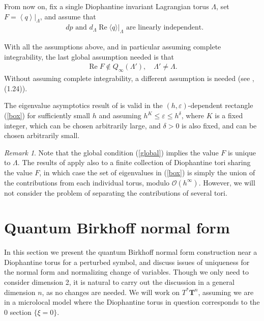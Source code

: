 \documentclass[12pt,lettersize]{article}
\DeclareMathOperator{\Real}{Re}
\renewcommand{\epsilon}{\varepsilon}
\theoremstyle{plain}%
\numberwithin{theorem}{section}
\numberwithin{equation}{section}
\theoremstyle{definition}
\theoremstyle{remark}
\newtheorem{remark}[theorem]{Remark}
\begin{document}
{From now on, fix a single Diophantine invariant Lagrangian torus $\Lambda$, set $F = \left\langle q \right\rangle|_{\Lambda}$, and assume that 
%
\begin{align}\label{nondeg}
\text{ $dp$ and $d_\Lambda\Real\langle q \rangle|_\Lambda$ are linearly independent.}
\end{align}
%


With all the assumptions above, and in particular assuming complete integrability, the last global assumption needed is that
%
\begin{align}\label{global}
\Real F \not\in Q_\infty(\Lambda'), \quad \Lambda' \neq \Lambda. 
\end{align}
%
Without assuming complete integrability, a different assumption is needed (see \cite{HSV}, (1.24)).

The eigenvalue asymptotics result of \cite{HSV} is valid in the $(h,\epsilon)$-dependent rectangle (\ref{box}) for sufficiently small $h$ and assuming $h^K \leq \epsilon \leq h^\delta$, where $K$ is a fixed integer, which can be chosen arbitrarily large, and $\delta > 0$ is also fixed, and can be chosen arbitrarily small. 

\begin{remark}
Note that the global condition (\ref{global}) implies the value $F$ is unique to $\Lambda$. The results of \cite{HSV} apply also to a finite collection of Diophantine tori sharing the value $F$, in which case the set of eigenvalues in (\ref{box}) is simply the union of the contributions from each individual torus, modulo $\mathcal{O}(h^\infty)$. However, we will not consider the problem of separating the contributions of several tori. 
\end{remark}


\section{Quantum Birkhoff normal form}\label{QBNF}

In this section we present the quantum Birkhoff normal form construction near a Diophantine torus for a perturbed symbol, and discuss issues of uniqueness for the normal form and normalizing change of variables. 
Though we only need to consider dimension 2, it is natural to carry out the discussion in a general dimension $n$, as no changes are needed. We will work on $T^*\mathbf{T}^n$, assuming we are in a microlocal model where the Diophantine torus in question corresponds to the 0 section $\{\xi = 0\}$. 

}
\end{document}
